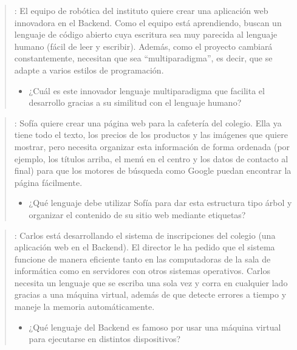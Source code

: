 \documentclass[letterpaper,10pt,spanish]{sphinxmanual}
\begin{document}
\begin{enumerate}
\begin{quote}
\begin{itemize}
\end{itemize}
\end{quote}
\begin{quote}

\sphinxAtStartPar
{}: El equipo de robótica del instituto quiere crear una aplicación web innovadora en el Back\sphinxhyphen{}end. Como el equipo está aprendiendo, buscan un lenguaje de código abierto cuya escritura sea muy parecida al lenguaje humano (fácil de leer y escribir). Además, como el proyecto cambiará constantemente, necesitan que sea “multiparadigma”, es decir, que se adapte a varios estilos de programación.
\begin{itemize}
\item {} 
\sphinxAtStartPar
¿Cuál es este innovador lenguaje multiparadigma que facilita el desarrollo gracias a su similitud con el lenguaje humano?

\end{itemize}
\end{quote}
\begin{quote}

\sphinxAtStartPar
{}: Sofía quiere crear una página web para la cafetería del colegio. Ella ya tiene todo el texto, los precios de los productos y las imágenes que quiere mostrar, pero necesita organizar esta información de forma ordenada (por ejemplo, los títulos arriba, el menú en el centro y los datos de contacto al final) para que los motores de búsqueda como Google puedan encontrar la página fácilmente.
\begin{itemize}
\item {} 
\sphinxAtStartPar
¿Qué lenguaje debe utilizar Sofía para dar esta estructura tipo árbol y organizar el contenido de su sitio web mediante etiquetas?

\end{itemize}
\end{quote}
\begin{quote}

\sphinxAtStartPar
{}: Carlos está desarrollando el sistema de inscripciones del colegio (una aplicación web en el Back\sphinxhyphen{}end). El director le ha pedido que el sistema funcione de manera eficiente tanto en las computadoras de la sala de informática como en servidores con otros sistemas operativos. Carlos necesita un lenguaje que se escriba una sola vez y corra en cualquier lado gracias a una máquina virtual, además de que detecte errores a tiempo y maneje la memoria automáticamente.
\begin{itemize}
\item {} 
\sphinxAtStartPar
¿Qué lenguaje del Back\sphinxhyphen{}end es famoso por usar una máquina virtual para ejecutarse en distintos dispositivos?


\end{itemize}
\end{quote}
\end{enumerate}
\end{document}
